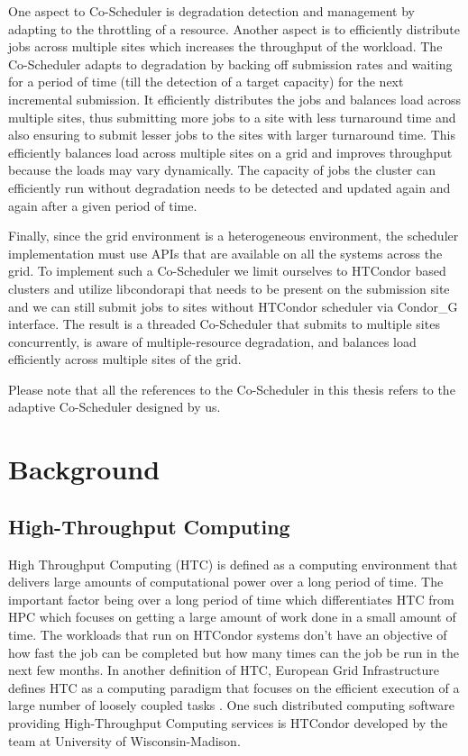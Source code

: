 \documentclass[ms,electronic,double]{nuthesis}
\begin{document}
One aspect to Co-Scheduler is degradation detection and management by adapting 
to the throttling of a resource. Another aspect is to efficiently distribute jobs 
across multiple sites which increases the throughput of the workload. The Co-Scheduler adapts to degradation by backing off submission rates and waiting for a 
period of time (till the detection of a target capacity) for the next incremental submission. It efficiently 
distributes the jobs and balances load across multiple sites, thus submitting more 
jobs to a site with less turnaround time and also ensuring to submit lesser 
jobs to the sites with larger turnaround time. This efficiently balances load 
across multiple sites on a grid and improves throughput because the loads may vary dynamically. 
The capacity of jobs the cluster can efficiently run without degradation needs to be detected and updated again and 
again after a given period of time.

Finally, since the grid environment is a heterogeneous environment, the scheduler implementation must use APIs that are available on all the systems across the grid. To implement such a Co-Scheduler
 we limit ourselves to HTCondor based clusters and utilize libcondorapi that needs to be present on the submission site and we can still submit jobs to sites without HTCondor scheduler via Condor_G interface. 
 The result is a threaded Co-Scheduler 
that submits to multiple sites concurrently, is aware of multiple-resource degradation, and
balances load efficiently across multiple sites of the grid. 

Please note that all the references to the Co-Scheduler in this thesis refers to the adaptive Co-Scheduler designed 
by us.  

\chapter{Background}

\section{High-Throughput Computing} High Throughput Computing (HTC) is defined as 
a computing environment that delivers large amounts of computational
power over a long period of time. The important factor being over a long period of time which 
differentiates HTC from HPC which focuses on getting a large amount of work done in a small amount of time.
The workloads that run on HTCondor systems don't have an objective of  how fast the job can be completed 
but how many times can the job be run in the next few months. In another definition of HTC, European Grid  
Infrastructure defines HTC as a computing paradigm that focuses on the efficient 
execution of a large number of loosely coupled tasks \cite{manual56}. One such 
distributed computing software providing High-Throughput Computing services is 
HTCondor developed by the team at University of Wisconsin-Madison\cite{manual56}.
\end{document}
